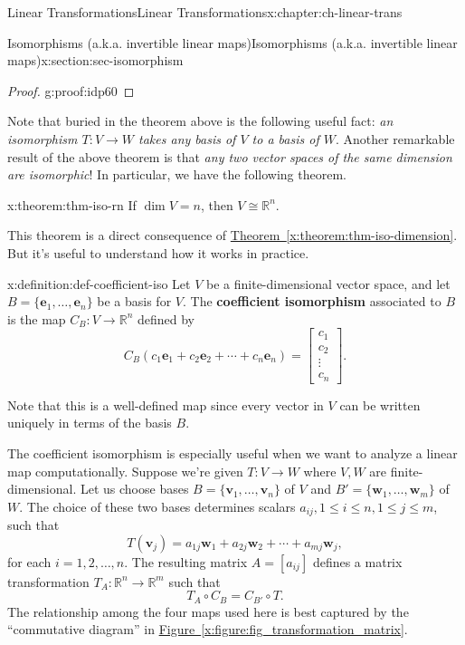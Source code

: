 \documentclass[oneside,10pt,]{book}
\newcommand{\xreffont}{\relax}
\newcommand{\terminology}[1]{\textbf{#1}}
\numberwithin{equation}{section}
\newcommand{\bbm}{\begin{bmatrix}}
\newcommand{\ebm}{\end{bmatrix}}
\newcommand{\R}{\mathbb{R}}
\newcommand{\vv}{\mathbf{v}}
\newcommand{\ww}{\mathbf{w}}
\begin{document}
\begin{chapterptx}{Linear Transformations}{}{Linear Transformations}{}{}{x:chapter:ch-linear-trans}
\begin{sectionptx}{Isomorphisms (a.k.a. invertible linear maps)}{}{Isomorphisms (a.k.a. invertible linear maps)}{}{}{x:section:sec-isomorphism}
\begin{proof}{}{g:proof:idp60}
\end{proof}
Note that buried in the theorem above is the following useful fact: \emph{an isomorphism \(T:V\to W\) takes any basis of \(V\) to a basis of \(W\)}. Another remarkable result of the above theorem is that \emph{any two vector spaces of the same dimension are isomorphic}! In particular, we have the following theorem.%
\begin{theorem}{}{}{x:theorem:thm-iso-rn}%
If \(\dim V=n\), then \(V\cong \R^n\).%
\end{theorem}
This theorem is a direct consequence of \hyperref[x:theorem:thm-iso-dimension]{Theorem~{\xreffont\ref{x:theorem:thm-iso-dimension}}}. But it's useful to understand how it works in practice.%
\begin{definition}{}{x:definition:def-coefficient-iso}%
Let \(V\) be a finite-dimensional vector space, and let \(B=\{\mathbf{e}_1,\ldots, \mathbf{e}_n\}\) be a basis for \(V\). The \terminology{coefficient isomorphism} associated to \(B\) is the map \(C_B:V\to \R^n\) defined by%
\begin{equation*}
C_B(c_1\mathbf{e}_1+c_2\mathbf{e}_2+\cdots +c_n\mathbf{e}_n)=\bbm c_1\\c_2\\\vdots \\c_n\ebm\text{.}
\end{equation*}
%
\end{definition}
Note that this is a well-defined map since every vector in \(V\) can be written uniquely in terms of the basis \(B\).%
\par
The coefficient isomorphism is especially useful when we want to analyze a linear map computationally. Suppose we're given \(T:V\to W\) where \(V, W\) are finite-dimensional. Let us choose bases \(B=\{\vv_1,\ldots, \vv_n\}\) of \(V\) and \(B' = \{\ww_1,\ldots, \ww_m\}\) of \(W\). The choice of these two bases determines scalars \(a_{ij}, 1\leq i\leq n, 1\leq j\leq m\), such that%
\begin{equation*}
T(\vv_j) = a_{1j}\ww_1+a_{2j}\ww_2+\cdots + a_{mj}\ww_j,
\end{equation*}
for each \(i=1,2,\ldots, n\). The resulting matrix \(A=[a_{ij}]\) defines a matrix transformation \(T_A:\R^n\to \R^m\) such that%
\begin{equation*}
T_A\circ C_B = C_{B'}\circ T\text{.}
\end{equation*}
The relationship among the four maps used here is best captured by the ``commutative diagram'' in \hyperref[x:figure:fig_transformation_matrix]{Figure~{\xreffont\ref{x:figure:fig_transformation_matrix}}}.%


\end{sectionptx}
\end{chapterptx}
\end{document}
